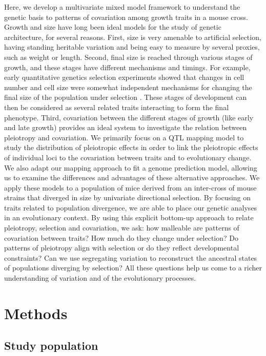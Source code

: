 \begin{refsection}
Here, we develop a multivariate mixed model framework to understand the
genetic basis to patterns of covariation among growth traits in a mouse
cross. Growth and size have long been ideal models for the study of
genetic architecture, for several reasons. First, size is very amenable
to artificial selection, having standing heritable variation and being
easy to measure by several proxies, such as weight or length. Second,
final size is reached through various stages of growth, and these stages
have different mechanisms and timings. For example, early quantitative
genetics selection experiments showed that changes in cell number and
cell size were somewhat independent mechanisms for changing the final
size of the population under selection \parencite{Falconer1978-kq,Cheverud1983-fq,Leamy1984-df,Riska1984-ml}.
These stages of development can then be considered as several
related traits interacting to form the final phenotype. Third,
covariation between the different stages of growth (like early and late
growth) provides an ideal system to investigate the relation between
pleiotropy and covariation. We primarily focus on a QTL mapping model to
study the distribution of pleiotropic effects in order to link the
pleiotropic effects of individual loci to the covariation between traits
and to evolutionary change. We also adapt our mapping approach to fit a
genome prediction model, allowing us to examine the differences and
advantages of these alternative approaches. We apply these models to a
population of mice derived from an inter-cross of mouse strains that
diverged in size by univariate directional selection. By focusing on
traits related to population divergence, we are able to place our
genetic analyses in an evolutionary context. By using this explicit
bottom-up approach to relate pleiotropy, selection and covariation, we
ask: how malleable are patterns of covariation between traits? How much
do they change under selection? Do patterns of pleiotropy align with
selection or do they reflect developmental constraints? Can we use
segregating variation to reconstruct the ancestral states of populations
diverging by selection? All these questions help us come to a richer
understanding of variation and of the evolutionary processes.


\section{Methods}

\subsection{Study population}


\end{refsection}
